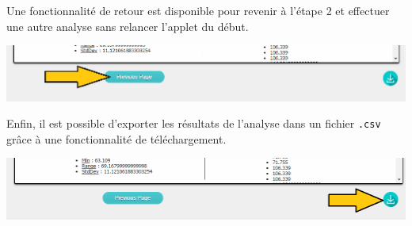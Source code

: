 		Une fonctionnalité de retour est disponible pour revenir à l'étape 2 et effectuer une autre analyse sans relancer l'applet du début.\\
			\begin{center}\includegraphics[scale=0.50]{fenetre3prec.png}\end{center}
		Enfin, il est possible d'exporter les résultats de l'analyse dans un fichier \lstinline!.csv! grâce à une fonctionnalité de téléchargement.\\
			\begin{center}\includegraphics[scale=0.50]{fenetre3Download.png}\end{center}


